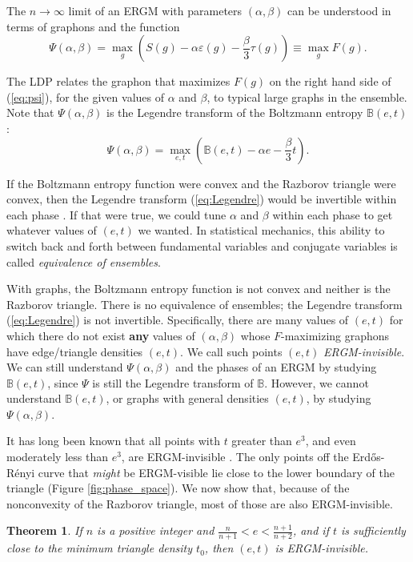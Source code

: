 \documentclass[12pt]{amsart}
\newtheorem{theorem}[lemma]{Theorem}
\newcommand\be{\begin{equation}}
\newcommand\ee{\end{equation}}
\newcommand{\tdens}{\tau}
\newcommand{\edens}{\varepsilon}
\newcommand{\ER}{Erd\H{o}s-R\'enyi}
\newcommand{\B}{\mathbb{B}}
\begin{document}
{The $n \to \infty$ limit of an ERGM with parameters $(\alpha, \beta)$ can be understood in terms of graphons and the 
function 
\be \Psi(\alpha, \beta) = \max_{g} \left ( S(g) - \alpha \edens(g) -\frac{\beta}{3} \tdens(g)\right ) \equiv \max_{g} F(g). \label{eq:psi} \ee 


The LDP relates the graphon that maximizes $F(g)$ on the right hand side of (\ref{eq:psi}), for
the given values of $\alpha$ and $\beta$, to typical large graphs in the ensemble.
Note that $\Psi(\alpha, \beta)$ is the Legendre transform of the Boltzmann entropy $\B(e,t)$: 
\be \Psi(\alpha, \beta) = \max_{e,t} \left ( \B(e,t) - \alpha e - \frac{\beta}{3} t \right ). \label{eq:Legendre} \ee

If the Boltzmann entropy function were convex and the Razborov triangle were convex, then the Legendre transform 
(\ref{eq:Legendre}) would be invertible within each phase \cite{Tou}. If that were true, we could tune $\alpha$ and $\beta$ 
within each phase to get whatever 
values of $(e,t)$ we wanted. In statistical mechanics, this ability to switch back and forth
between fundamental variables and conjugate variables is called
{\em equivalence of ensembles}.  

With graphs, the Boltzmann entropy function is not convex and neither is
the Razborov triangle. There is no equivalence of ensembles; the Legendre transform (\ref{eq:Legendre}) is not invertible. 
Specifically, there are many values of $(e,t)$ for
which there do not exist {\bf any} values of $(\alpha, \beta)$ whose $F$-maximizing 
graphons have 
edge/triangle densities $(e,t)$. We call such points $(e,t)$ {\em ERGM-invisible}. 
We can still understand
$\Psi(\alpha, \beta)$ and the phases of an ERGM by studying $\B(e,t)$, since $\Psi$ is still the Legendre
transform of $\B$. However, we cannot understand $\B(e,t)$, or graphs with general densities $(e,t)$,
by studying $\Psi(\alpha, \beta)$. 

It has long been known that all points with $t$ greater than $e^3$, and even moderately
less than $e^3$, are ERGM-invisible \cite{CD}. 
The only points off the \ER{} curve that {\em might} be ERGM-visible 
lie close to the lower boundary of the  
triangle (Figure \ref{fig:phase_space}). We now show that, because of the nonconvexity of the Razborov triangle, most of those are also
ERGM-invisible. 

\begin{theorem} \label{thm:noERGM1} If $n$ is a positive integer and $\frac{n}{n+1} < e < \frac{n+1}{n+2}$, and if 
$t$ is sufficiently close to the minimum triangle density $t_0$, then $(e, t)$ is ERGM-invisible.
\label{thm:no-ERGM}
\end{theorem}

}
\end{document}
